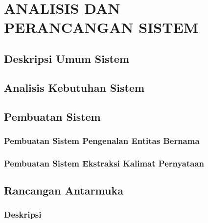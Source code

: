 \documentclass[ugmtesis]{ugmtesis}
\begin{document}
\chapter{ANALISIS DAN PERANCANGAN SISTEM}
\label{ANALISIS DAN PERANCANGAN SISTEM}

	\section{Deskripsi Umum Sistem}
	\label{rancangan deskripsi umum sistem}
	

	\section{Analisis Kebutuhan Sistem}
	\label{rancangan analisis kebutuhan sistem}
	

	\section{Pembuatan Sistem}
	\label{rancangan pembuatan sistem}

		\subsection{Pembuatan Sistem Pengenalan Entitas Bernama}
		\label{rancangan pembuatan sistem pengenalan entitas bernama}
		

		\subsection{Pembuatan Sistem Ekstraksi Kalimat Pernyataan}
		\label{rancangan sistem ekstraksi kalimat pernyataan}
		

	\section{Rancangan Antarmuka}
	\label{rancangan antarmuka}

		\subsection{Deskripsi}
		\label{rancangan deskripsi antarmuka}
		
\end{document}
